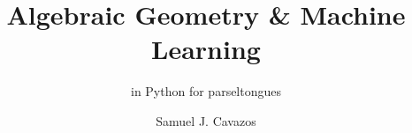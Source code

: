 \documentclass[graybox,envcountchap,sectrefs]{./style/svmono}
\begin{document}
\author{Samuel J. Cavazos}
\title{Algebraic Geometry \& Machine Learning}
\subtitle{in Python for parseltongues}
\maketitle

\frontmatter%


%



\tableofcontents




\mainmatter%




\backmatter%

% 
\printindex

\end{document}
